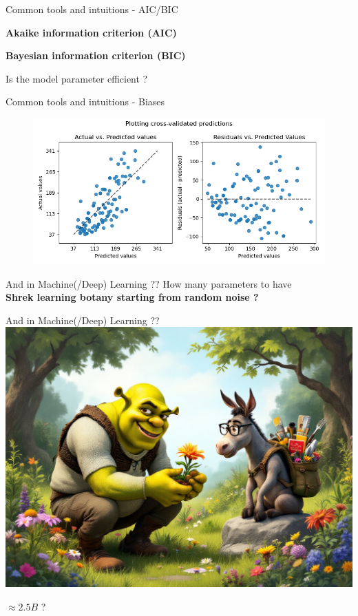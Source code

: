 \documentclass{irdbeamer}
\begin{document}
\begin{frame}{Common tools and intuitions - AIC/BIC}
    \begin{center}
    \textbf{Akaike information criterion (AIC)}

    \textbf{Bayesian information criterion (BIC)}

        Is the model parameter efficient ?
    \end{center}
\end{frame}

\begin{frame}{Common tools and intuitions - Biases}
    \begin{figure}
        \centering
        \includegraphics[width = .8\textwidth]{./figs/residuals.png}
    \end{figure}
\end{frame}

\begin{frame}{And in Machine(/Deep) Learning ??}
    \centering
    How many parameters to have\\
    \textbf{Shrek learning botany starting from random noise ?}
\end{frame}

\begin{frame}{And in Machine(/Deep) Learning ??}
    \centering
        \includegraphics[width = .5\textwidth]{./figs/shrek.jpg}

        $\approx 2.5B$ ?
\end{frame}
\end{document}
